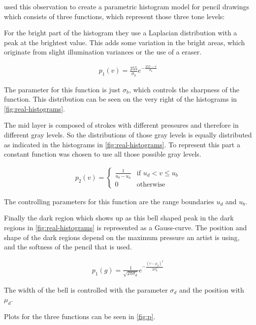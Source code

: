 \cite{mainPaper} used this observation to create a parametric histogram model
for pencil drawings which consists of three functions, which represent those
three tone levels:

For the bright part of the histogram they use a Laplacian distribution with a
peak at the brightest value. This adds some variation in the bright areas, which
originate from slight illumination variances or the use of a eraser.

\begin{align}
  p_1(v) = \frac{255}{\sigma_b} e ^{-\frac{255-v}{\sigma_b}} \label{eq:p_1}
\end{align}

The parameter for this function is just $\sigma_b$, which controls the sharpness of
the function. This distribution can be seen on the very right of the histograms
in \autoref{fig:real-histograms}.

The mid layer is composed of strokes with different pressures and therefore in
different gray levels. So the distributions of those gray levels is equally
distributed as indicated in the histograms in \autoref{fig:real-histograms}. To
represent this part a constant function was chosen to use all those possible
gray levels.

\begin{align}
  p_2(v) = \begin{cases} \frac{1}{u_b - u_a} & \text{if } u_d < v \leq u_b\\
    0 & \text{otherwise}
  \end{cases} \label{eq:p_2}
\end{align}

The controlling parameters for this function are the range boundaries $u_d$
and $u_b$.

Finally the dark region which shows up as this bell shaped peak in the dark
regions in \autoref{fig:real-histograms} is represented as a Gauss-curve. The
position and shape of the dark regions depend on the maximum pressure an artist is using,
and the softness of the pencil that is used.

\begin{align}
  p_1(g) = \frac{1}{\sqrt{2\pi \sigma_d}} e^{-\frac{(v-\mu_d)^2}{2\sigma_d^2}} 
  \label{eq:p_3}
\end{align}

The width of the bell is controlled with the parameter $\sigma_d$ and the
position with $\mu_d$.

Plots for the three functions can be seen in \autoref{fig:p}.

